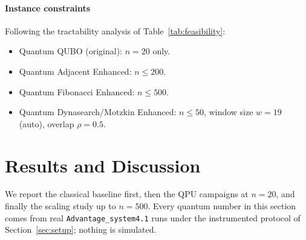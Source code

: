 \documentclass[preprint,12pt,authoryear]{elsarticle}
\begin{document}
\paragraph{Instance constraints}
Following the tractability analysis of Table~\ref{tab:feasibility}:
\begin{itemize}
  \item Quantum QUBO (original): $n = 20$ only.
  \item Quantum Adjacent Enhanced: $n \leq 200$.
  \item Quantum Fibonacci Enhanced: $n \leq 500$.
  \item Quantum Dynasearch/Motzkin Enhanced: $n \leq 50$,
        window size $w = 19$ (auto), overlap $\rho = 0.5$.
\end{itemize}

\section{Results and Discussion}
\label{sec:results}

We report the classical baseline first, then the QPU campaigns at
$n = 20$, and finally the scaling study up to $n = 500$. Every quantum
number in this section comes from real \texttt{Advantage\_system4.1}
runs under the instrumented protocol of Section~\ref{sec:setup};
nothing is simulated.
\end{document}
